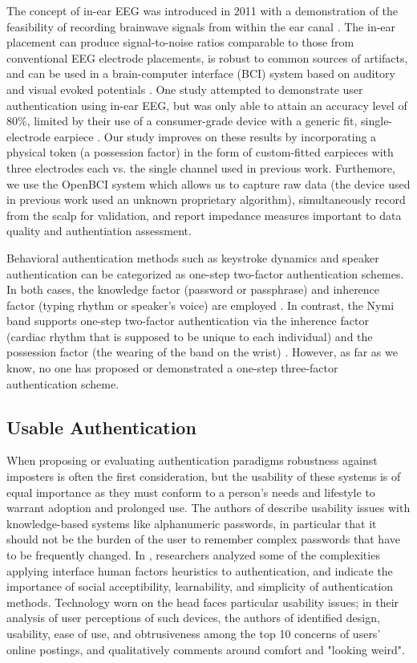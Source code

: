 \documentclass{sigchi}
\begin{document}
The concept of in-ear EEG was introduced in 2011 with a demonstration of the feasibility of recording brainwave signals from within the ear canal \cite{Looney2011}. The in-ear placement can produce signal-to-noise ratios comparable to those from conventional EEG electrode placements, is robust to common sources of artifacts, and can be used in a brain-computer interface (BCI) system based on auditory and visual evoked potentials \cite{Kidmose2013a}. One study attempted to demonstrate user authentication using in-ear EEG, but was only able to attain an accuracy level of 80\%, limited by their use of a consumer-grade device with a generic fit, single-electrode earpiece \cite{curran2016passthoughts}. Our study improves on these results by incorporating a physical token (a possession factor) in the form of custom-fitted earpieces with three electrodes each vs. the single channel used in previous work. Furthemore, we use the OpenBCI system which allows us to capture raw data (the device used in previous work used an unknown proprietary algorithm), simultaneously record from the scalp for validation, and report impedance measures important to data quality and authentiation assessment.

Behavioral authentication methods such as keystroke dynamics and speaker authentication can be categorized as one-step two-factor authentication schemes. In both cases, the knowledge factor (password or passphrase) and inherence factor (typing rhythm or speaker's voice) are employed \cite{Monrose1997}. In contrast, the Nymi band supports one-step two-factor authentication via the inherence factor (cardiac rhythm that is supposed to be unique to each individual) and the possession factor (the wearing of the band on the wrist) \cite{Nymi}. However, as far as we know, no one has proposed or demonstrated a one-step three-factor authentication scheme.

\subsection{Usable Authentication}

When proposing or evaluating authentication paradigms robustness against imposters is often the first consideration, but the usability of these systems is of equal importance as they must conform to a person's needs and lifestyle to warrant adoption and prolonged use. The authors of \cite{sasse2001} describe usability issues with knowledge-based systems like alphanumeric passwords, in particular that it should not be the burden of the user to remember complex passwords that have to be frequently changed. In \cite{braz2006}, researchers analyzed some of the complexities applying interface human factors heuristics to authentication, and indicate the importance of social acceptibility, learnability, and simplicity of authentication methods. Technology worn on the head faces particular usability issues; in their analysis of user perceptions of such devices, the authors of \cite{Genaro2014} identified design, usability, ease of use, and obtrusiveness among the top 10 concerns of users' online postings, and qualitatively comments around comfort and "looking weird".
\end{document}
